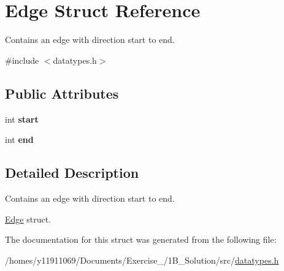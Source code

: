\hypertarget{structEdge}{\section{Edge Struct Reference}
\label{structEdge}
}


Contains an edge with direction start to end.  




{\ttfamily \#include $<$datatypes.\-h$>$}

\subsection*{Public Attributes}
\begin{DoxyCompactItemize}
\item 
\hypertarget{structEdge_a456256b2cfa3c43e54d6f42fb42da7ee}{int {\bfseries start}}\label{structEdge_a456256b2cfa3c43e54d6f42fb42da7ee}

\item 
\hypertarget{structEdge_a1ee2e4ebcf1b4b9de5c791dbe906682d}{int {\bfseries end}}\label{structEdge_a1ee2e4ebcf1b4b9de5c791dbe906682d}

\end{DoxyCompactItemize}


\subsection{Detailed Description}
Contains an edge with direction start to end. 

\hyperlink{structEdge}{Edge} struct. 

The documentation for this struct was generated from the following file\-:\begin{DoxyCompactItemize}
\item 
/homes/y11911069/\-Documents/\-Exercise\-\_/1\-B\-\_\-\-Solution/src/\hyperlink{datatypes_8h}{datatypes.\-h}\end{DoxyCompactItemize}
